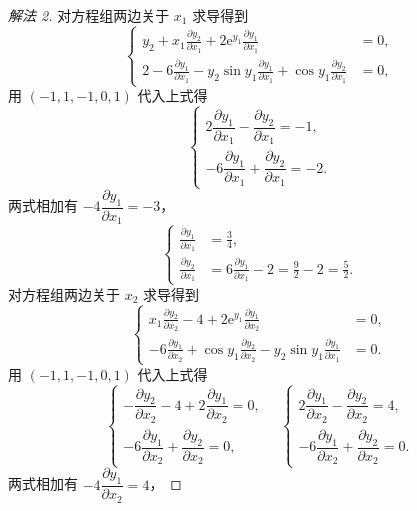 \begin{proof}[解法 2]
对方程组两边关于 $x_{1}$ 求导得到
\[
  \left\{\begin{aligned}
    y_{2} + x_{1}\frac{\partial y_{2}}{\partial x_{1}} + 2\mathrm{e}^{y_{1}}\frac{\partial y_{1}}{\partial x_{1}} &= 0, \\
    2 - 6\frac{\partial y_{1}}{\partial x_{1}} - y_{2}\sin y_{1}\frac{\partial y_{1}}{\partial x_{1}} + \cos y_{1}\frac{\partial y_{2}}{\partial x_{1}} &= 0,
  \end{aligned}\right.
\]
用 $(-1,1,-1,0,1)$ 代入上式得
\[
  \begin{cases}
    2\dfrac{\partial y_{1}}{\partial x_{1}} - \dfrac{\partial y_{2}}{\partial x_{1}} = -1, \\[4pt]
    -6\dfrac{\partial y_{1}}{\partial x_{1}} + \dfrac{\partial y_{2}}{\partial x_{1}} = -2.
  \end{cases}
\]
两式相加有 $-4\dfrac{\partial y_{1}}{\partial x_{1}} = -3$，
\[
  \left\{\begin{aligned}
    \frac{\partial y_{1}}{\partial x_{1}} &= \frac{3}{4}, \\
    \frac{\partial y_{2}}{\partial x_{1}} &= 6\frac{\partial y_{1}}{\partial x_{1}} - 2 = \frac{9}{2} - 2 = \frac{5}{2}.
  \end{aligned}\right.
\]
对方程组两边关于 $x_{2}$ 求导得到
\[
  \left\{\begin{aligned}
    x_{1}\frac{\partial y_{2}}{\partial x_{2}} - 4 + 2\mathrm{e}^{y_{1}}\frac{\partial y_{1}}{\partial x_{2}} &= 0, \\
    -6\frac{\partial y_{1}}{\partial x_{2}} + \cos y_{1}\frac{\partial y_{2}}{\partial x_{2}} - y_{2}\sin y_{1}\frac{\partial y_{1}}{\partial x_{1}} &= 0.
  \end{aligned}\right.
\]
用 $(-1,1,-1,0,1)$ 代入上式得
\[
  \begin{cases}
    -\dfrac{\partial y_{2}}{\partial x_{2}} - 4 + 2\dfrac{\partial y_{1}}{\partial x_{2}} = 0, \\[6pt]
    -6\dfrac{\partial y_{1}}{\partial x_{2}} + \dfrac{\partial y_{2}}{\partial x_{2}} = 0,
  \end{cases}
  \quad
  \begin{cases}
    2\dfrac{\partial y_{1}}{\partial x_{2}} - \dfrac{\partial y_{2}}{\partial x_{2}} = 4, \\[6pt]
    -6\dfrac{\partial y_{1}}{\partial x_{2}} + \dfrac{\partial y_{2}}{\partial x_{2}} = 0.
  \end{cases}
\]
两式相加有 $-4\dfrac{\partial y_{1}}{\partial x_{2}} = 4$，

\end{proof}
